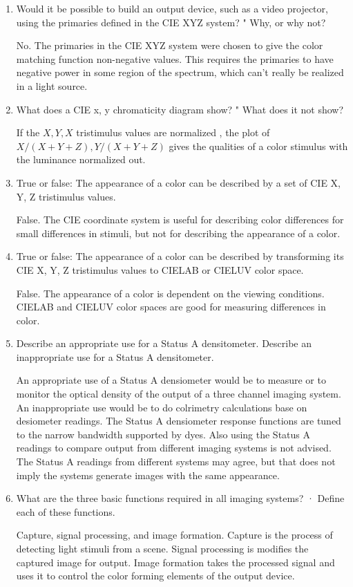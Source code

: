 \documentclass{amsart}
\theoremstyle{definition}
\theoremstyle{remark}
\numberwithin{equation}{section}
\begin{document}
\begin{enumerate}
\item Would it be possible to build an output device, such as a
video projector, using the primaries defined in the CIE XYZ
system? " Why, or why not? \par No.  The primaries in the CIE XYZ
system were chosen to give the color matching function
non-negative values.  This requires the primaries to have negative
power in some region of the spectrum, which can't really be
realized in a light source.

\item What does a CIE x, y chromaticity diagram show? "   What
does it not show? \par If the $X, Y, X$  tristimulus values are
normalized , the plot of $X/(X+Y+Z), Y/(X+Y+Z)$ gives the
qualities of a color stimulus with the luminance normalized out.

\item True or false: The appearance of a color can be described by
a set of CIE X, Y, Z tristimulus values.\par False.  The CIE
coordinate system is useful for describing color differences for
small differences in stimuli, but not for describing the
appearance of a color.

\item True or false: The appearance of a color can be described by
transforming its CIE X, Y, Z tristimulus values to CIELAB or
CIELUV color space.
\par  False.   The appearance of a color is dependent on the
viewing conditions.  CIELAB and CIELUV color spaces are good for
measuring differences in color.

\item  Describe an appropriate use for a Status A densitometer.
Describe an inappropriate use for a Status A densitometer.
\par  An appropriate use of a Status A densiometer would be to measure or to monitor
the optical density of the output of a three channel imaging
system.  An inappropriate use would be to do colrimetry
calculations base on desiometer readings.  The Status A
densiometer response functions are tuned to the narrow bandwidth
supported by dyes.  Also using the Status A readings to compare
output from different imaging systems is not advised.  The Status
A readings from different systems may agree, but that does not
imply the systems generate images with the same appearance.

\item What are the three basic functions required in all imaging
systems?
 · Define each of these functions.
\par Capture, signal processing, and image formation.  Capture is
the process of detecting light stimuli from a scene.  Signal
processing is modifies the captured image for output.  Image
formation takes the processed signal and uses it to control the
color forming elements of the output device.


\end{enumerate}
\end{document}
